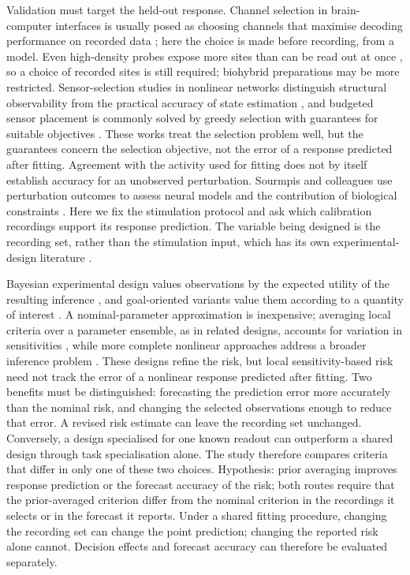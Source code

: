 Validation must target the held-out response. Channel selection in brain-computer interfaces is usually posed as choosing channels that maximise decoding performance on recorded data \cite{ref30}; here the choice is made before recording, from a model. Even high-density probes expose more sites than can be read out at once \cite{ref31}, so a choice of recorded sites is still required; biohybrid preparations may be more restricted. Sensor-selection studies in nonlinear networks distinguish structural observability from the practical accuracy of state estimation \cite{ref07}, and budgeted sensor placement is commonly solved by greedy selection with guarantees for suitable objectives \cite{ref25}. These works treat the selection problem well, but the guarantees concern the selection objective, not the error of a response predicted after fitting. Agreement with the activity used for fitting does not by itself establish accuracy for an unobserved perturbation. Sourmpis and colleagues use perturbation outcomes to assess neural models and the contribution of biological constraints \cite{ref08}. Here we fix the stimulation protocol and ask which calibration recordings support its response prediction. The variable being designed is the recording set, rather than the stimulation input, which has its own experimental-design literature \cite{ref09,ref32}.

Bayesian experimental design values observations by the expected utility of the resulting inference \cite{ref18,ref24}, and goal-oriented variants value them according to a quantity of interest \cite{ref10}. A nominal-parameter approximation is inexpensive; averaging local criteria over a parameter ensemble, as in related designs, accounts for variation in sensitivities \cite{ref21}, while more complete nonlinear approaches address a broader inference problem \cite{ref11,ref19,ref20,ref22}. These designs refine the risk, but local sensitivity-based risk need not track the error of a nonlinear response predicted after fitting. Two benefits must be distinguished: forecasting the prediction error more accurately than the nominal risk, and changing the selected observations enough to reduce that error. A revised risk estimate can leave the recording set unchanged. Conversely, a design specialised for one known readout can outperform a shared design through task specialisation alone. The study therefore compares criteria that differ in only one of these two choices. Hypothesis: prior averaging improves response prediction or the forecast accuracy of the risk; both routes require that the prior-averaged criterion differ from the nominal criterion in the recordings it selects or in the forecast it reports. Under a shared fitting procedure, changing the recording set can change the point prediction; changing the reported risk alone cannot. Decision effects and forecast accuracy can therefore be evaluated separately.

